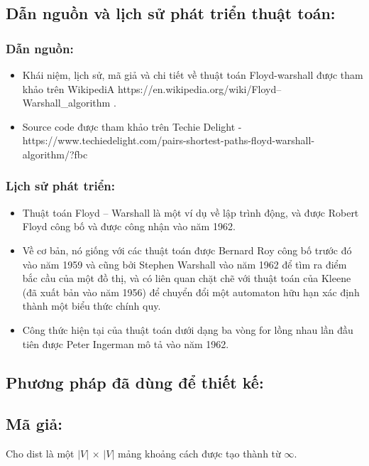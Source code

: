 \documentclass{article}
\begin{document}
\subsection{Dẫn nguồn và lịch sử phát triển thuật toán:}
\subsubsection{Dẫn nguồn:}
    \begin{itemize}
        \begin{itemize}
            \item Khái niệm, lịch sử, mã giả và chi tiết về thuật toán Floyd-warshall được tham khảo trên WikipediA https://en.wikipedia.org/wiki/Floyd–Warshall_algorithm . \\ \hline
            \item Source code được tham khảo trên Techie Delight -  https://www.techiedelight.com/pairs-shortest-paths-floyd-warshall-algorithm/?fbc 
        \end{itemize}
    \end{itemize}
\subsubsection{Lịch sử phát triển:}
    \begin{itemize}
        \begin{itemize}
            \item Thuật toán Floyd – Warshall là một ví dụ về lập trình động, và được Robert Floyd công bố và được công nhận vào năm 1962. 
            \item Về cơ bản, nó giống với các thuật toán được Bernard Roy công bố trước đó vào năm 1959 và cũng bởi Stephen Warshall vào năm 1962 để tìm ra điểm bắc cầu của một đồ thị, và có liên quan chặt chẽ với thuật toán của Kleene (đã xuất bản vào năm 1956) để chuyển đổi một automaton hữu hạn xác định thành một biểu thức chính quy.
            \item Công thức hiện tại của thuật toán dưới dạng ba vòng for lồng nhau lần đầu tiên được Peter Ingerman mô tả vào năm 1962.
        \end{itemize}
    \end{itemize}
\subsection{Phương pháp đã dùng để thiết kế:}
\subsection{Mã giả:}
Cho dist là một $|V|$ × $|V|$ mảng khoảng cách được tạo thành từ $\infty$.
    \noindent 
    
\end{document}
